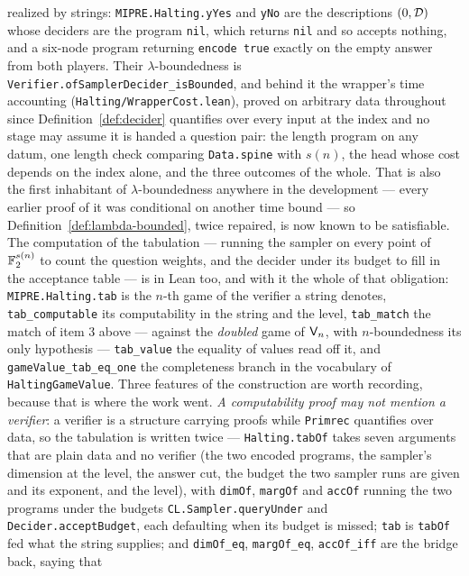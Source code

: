 \begin{remark}
realized by strings: \texttt{MIPRE.Halting.yYes} and \texttt{yNo} are the descriptions
$(0, \mathcal{D})$ whose deciders are the program \texttt{nil}, which returns \texttt{nil} and so
accepts nothing, and a six-node program returning \texttt{encode true} exactly on the empty
answer from both players. Their $\lambda$-boundedness is
\texttt{Verifier.ofSamplerDecider\_isBounded}, and behind it the wrapper's time accounting
(\texttt{Halting/WrapperCost.lean}), proved on arbitrary data throughout since
Definition~\ref{def:decider} quantifies over every input at the index and no stage may assume
it is handed a question pair: the length program on any datum, one length check comparing
\texttt{Data.spine} with $s(n)$, the head whose cost depends on the index alone, and the three
outcomes of the whole. That is also the first inhabitant of $\lambda$-boundedness anywhere in
the development --- every earlier proof of it was conditional on another time bound --- so
Definition~\ref{def:lambda-bounded}, twice repaired, is now known to be satisfiable. The
computation of the tabulation --- running the sampler on every point of $\mathbb{F}_2^{s(n)}$ to count
the question weights, and the decider under its budget to fill in the acceptance table --- is
in Lean too, and with it the whole of that obligation: \texttt{MIPRE.Halting.tab} is the
$n$-th game of the verifier a string denotes, \texttt{tab\_computable} its computability in
the string and the level, \texttt{tab\_match} the match of item 3
above --- against the \emph{doubled} game of $\mathsf{V}_n$, with $n$-boundedness its only
hypothesis --- \texttt{tab\_value} the equality of values read off it, and
\texttt{gameValue\_tab\_eq\_one} the completeness branch in the vocabulary of
\texttt{HaltingGameValue}. Three features of
the construction are worth recording, because that is where the work went. \emph{A
computability proof may not mention a verifier}: a verifier is a structure carrying proofs
while \texttt{Primrec} quantifies over data, so the tabulation is written twice ---
\texttt{Halting.tabOf} takes seven arguments that are plain data and no verifier (the two
encoded programs, the sampler's dimension at the level, the answer cut, the budget the two
sampler runs are given and its exponent, and the level), with \texttt{dimOf}, \texttt{margOf}
and \texttt{accOf} running the two programs under the budgets
\texttt{CL.Sampler.queryUnder} and \texttt{Decider.acceptBudget}, each defaulting when its
budget is missed; \texttt{tab} is \texttt{tabOf} fed what the string supplies; and
\texttt{dimOf\_eq}, \texttt{margOf\_eq}, \texttt{accOf\_iff} are the bridge back, saying that

\end{remark}

